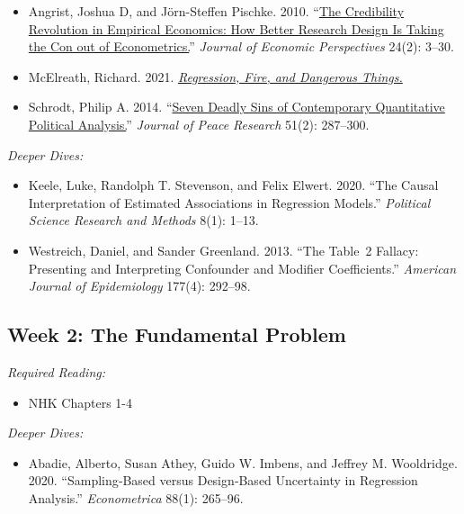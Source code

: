 \documentclass[11pt, letterpaper]{article}
\begin{document}
\begin{itemize}
	\item Angrist, Joshua D, and Jörn-Steffen Pischke. 2010. ``\href{https://pubs.aeaweb.org/doi/pdfplus/10.1257/jep.24.2.3}{The Credibility Revolution in Empirical Economics: How Better Research Design Is Taking the Con out of Econometrics.}'' \textit{Journal of Economic Perspectives} 24(2): 3–30.
	\item McElreath, Richard. 2021. \href{https://elevanth.org/blog/2021/06/15/regression-fire-and-dangerous-things-1-3/}{\textit{Regression, Fire, and Dangerous Things.}}
	\item Schrodt, Philip A. 2014. ``\href{https://journals.sagepub.com/doi/pdf/10.1177/0022343313499597}{Seven Deadly Sins of Contemporary Quantitative Political Analysis.}'' \textit{Journal of Peace Research} 51(2): 287–300.
\end{itemize}

\textit{Deeper Dives:}

\begin{itemize}
	\item Keele, Luke, Randolph T. Stevenson, and Felix Elwert. 2020. ``The Causal Interpretation of Estimated Associations in Regression Models.'' \textit{Political Science Research and Methods} 8(1): 1–13.
	\item Westreich, Daniel, and Sander Greenland. 2013. ``The Table 2 Fallacy: Presenting and Interpreting Confounder and Modifier Coefficients.'' \textit{American Journal of Epidemiology} 177(4): 292–98.
	
\end{itemize}




\subsection*{Week 2: The Fundamental Problem}

\textit{Required Reading:}

\begin{itemize}
	\item NHK Chapters 1-4
\end{itemize}

\noindent \textit{Deeper Dives:}

\begin{itemize}
	\item Abadie, Alberto, Susan Athey, Guido W. Imbens, and Jeffrey M. Wooldridge. 2020. ``Sampling‐Based versus Design‐Based Uncertainty in Regression Analysis.'' \textit{Econometrica} 88(1): 265–96.
\end{itemize}
\end{document}
